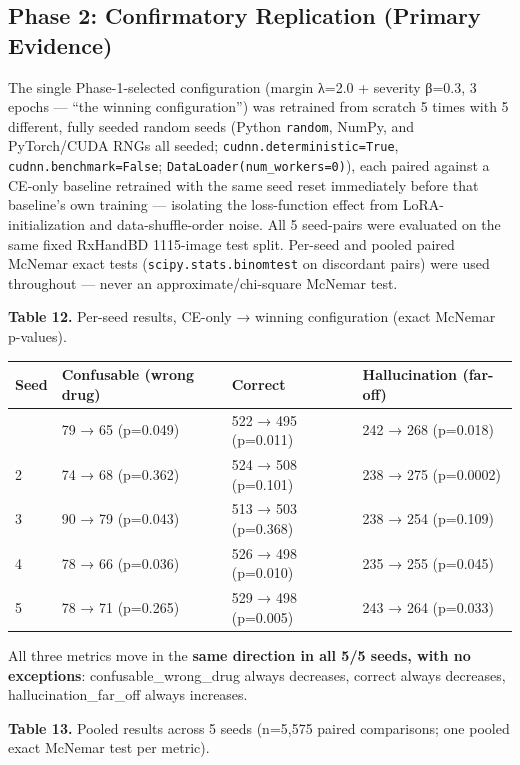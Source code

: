 \documentclass[fleqn,10pt]{wlpeerj}
\begin{document}
\subsection*{Phase 2: Confirmatory Replication (Primary Evidence)}\label{sec:phase2-results}

The single Phase-1-selected configuration (margin λ=2.0 + severity β=0.3, 3 epochs --- ``the winning configuration'') was retrained from scratch 5 times with 5 different, fully seeded random seeds (Python \texttt{random}, NumPy, and PyTorch/CUDA RNGs all seeded; \texttt{cudnn.deterministic=True}, \texttt{cudnn.benchmark=False}; \texttt{DataLoader(num\_workers=0)}), each paired against a CE-only baseline retrained with the same seed reset immediately before that baseline's own training --- isolating the loss-function effect from LoRA-initialization and data-shuffle-order noise. All 5 seed-pairs were evaluated on the same fixed RxHandBD 1115-image test split. Per-seed and pooled paired McNemar exact tests (\texttt{scipy.stats.binomtest} on discordant pairs) were used throughout --- never an approximate/chi-square McNemar test.

\textbf{Table 12.} Per-seed results, CE-only → winning configuration (exact McNemar p-values).

\begin{longtable}[]{@{}llll@{}}
\toprule\noalign{}
Seed & Confusable (wrong drug) & Correct & Hallucination (far-off) \\
\midrule\noalign{}
\endhead
\bottomrule\noalign{}
\endlastfoot
1 & 79 → 65 (p=0.049) & 522 → 495 (p=0.011) & 242 → 268 (p=0.018) \\
2 & 74 → 68 (p=0.362) & 524 → 508 (p=0.101) & 238 → 275 (p=0.0002) \\
3 & 90 → 79 (p=0.043) & 513 → 503 (p=0.368) & 238 → 254 (p=0.109) \\
4 & 78 → 66 (p=0.036) & 526 → 498 (p=0.010) & 235 → 255 (p=0.045) \\
5 & 78 → 71 (p=0.265) & 529 → 498 (p=0.005) & 243 → 264 (p=0.033) \\
\end{longtable}

All three metrics move in the \textbf{same direction in all 5/5 seeds, with no exceptions}: confusable\_wrong\_drug always decreases, correct always decreases, hallucination\_far\_off always increases.

\textbf{Table 13.} Pooled results across 5 seeds (n=5,575 paired comparisons; one pooled exact McNemar test per metric).
\end{document}
